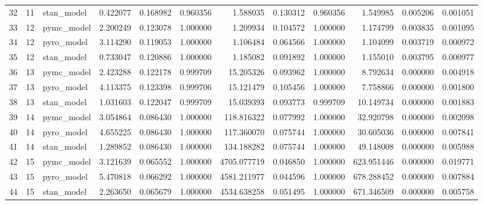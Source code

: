 \begin{tabular}{lrlrrrrrrrrr}
32 & 11 & stan_model & 0.422077 & 0.168982 & 0.960356 & 1.588035 & 0.130312 & 0.960356 & 1.549985 & 0.005206 & 0.001051 \\
33 & 12 & pymc_model & 2.200249 & 0.123078 & 1.000000 & 1.209934 & 0.104572 & 1.000000 & 1.174799 & 0.003835 & 0.001095 \\
34 & 12 & pyro_model & 3.114290 & 0.119053 & 1.000000 & 1.106484 & 0.064566 & 1.000000 & 1.104099 & 0.003719 & 0.000972 \\
35 & 12 & stan_model & 0.733047 & 0.120886 & 1.000000 & 1.185082 & 0.091892 & 1.000000 & 1.155010 & 0.003795 & 0.000977 \\
36 & 13 & pymc_model & 2.423288 & 0.122178 & 0.999709 & 15.205326 & 0.093962 & 1.000000 & 8.792634 & 0.000000 & 0.004918 \\
37 & 13 & pyro_model & 4.113375 & 0.123398 & 0.999706 & 15.121479 & 0.105456 & 1.000000 & 7.758866 & 0.000000 & 0.001800 \\
38 & 13 & stan_model & 1.031603 & 0.122047 & 0.999709 & 15.039393 & 0.093773 & 0.999709 & 10.149734 & 0.000000 & 0.001883 \\
39 & 14 & pymc_model & 3.054864 & 0.086430 & 1.000000 & 118.816322 & 0.077992 & 1.000000 & 32.920798 & 0.000000 & 0.002098 \\
40 & 14 & pyro_model & 4.655225 & 0.086430 & 1.000000 & 117.360070 & 0.075744 & 1.000000 & 30.605036 & 0.000000 & 0.007841 \\
41 & 14 & stan_model & 1.289852 & 0.086430 & 1.000000 & 134.188282 & 0.075744 & 1.000000 & 49.148008 & 0.000000 & 0.005988 \\
42 & 15 & pymc_model & 3.121639 & 0.065552 & 1.000000 & 4705.077719 & 0.046850 & 1.000000 & 623.951446 & 0.000000 & 0.019771 \\
43 & 15 & pyro_model & 5.470818 & 0.066292 & 1.000000 & 4581.211977 & 0.044596 & 1.000000 & 678.288452 & 0.000000 & 0.007884 \\
44 & 15 & stan_model & 2.263650 & 0.065679 & 1.000000 & 4534.638258 & 0.051495 & 1.000000 & 671.346509 & 0.000000 & 0.005758 \\
\bottomrule
\end{tabular}
